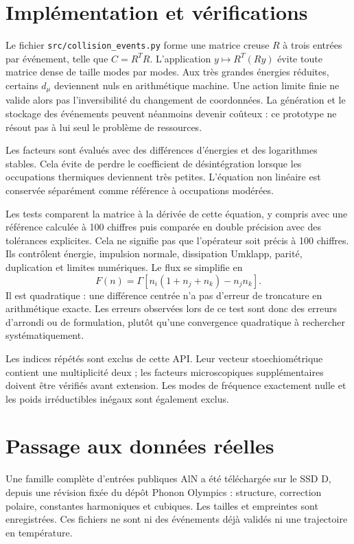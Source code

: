 \documentclass[11pt,a4paper]{article}
\begin{document}
\section{Implémentation et vérifications}
Le fichier \texttt{src/collision\_events.py} forme une matrice creuse $R$
à trois entrées par événement, telle que $C=R^TR$. L'application
$y\mapsto R^T(Ry)$ évite toute matrice dense de taille modes par modes.
Aux très grandes énergies réduites, certains $d_\mu$ deviennent nuls
en arithmétique machine. Une action limite finie ne valide alors pas
l'inversibilité du changement de coordonnées.
La génération et le stockage des événements peuvent néanmoins devenir
coûteux : ce prototype ne résout pas à lui seul le problème de ressources.

Les facteurs sont évalués avec des différences d'énergies et des logarithmes
stables. Cela évite de perdre le coefficient de désintégration lorsque les
occupations thermiques deviennent très petites.
L'équation non linéaire est conservée séparément comme référence à
occupations modérées.

Les tests comparent la matrice à la dérivée de cette équation, y compris
avec une référence calculée à 100 chiffres puis comparée en double
précision avec des tolérances explicites. Cela ne signifie pas que
l'opérateur soit précis à 100 chiffres. Ils contrôlent énergie, impulsion
normale, dissipation Umklapp, parité, duplication et limites numériques.
Le flux se simplifie en
\[
 F(n)=\Gamma[n_i(1+n_j+n_k)-n_jn_k].
\]
Il est quadratique : une différence centrée n'a pas d'erreur de troncature
en arithmétique exacte. Les erreurs observées lors de ce test sont donc
des erreurs d'arrondi ou de formulation, plutôt qu'une convergence
quadratique à rechercher systématiquement.

Les indices répétés sont exclus de cette API. Leur vecteur
stoechiométrique contient une multiplicité deux ; les facteurs
microscopiques supplémentaires doivent être vérifiés avant extension.
Les modes de fréquence exactement nulle et les poids irréductibles
inégaux sont également exclus.

\section{Passage aux données réelles}
Une famille complète d'entrées publiques AlN a été téléchargée sur le
SSD D, depuis une révision fixée du dépôt Phonon Olympics :
structure, correction polaire, constantes harmoniques et cubiques.
Les tailles et empreintes sont enregistrées. Ces fichiers ne sont
ni des événements déjà validés ni une trajectoire en température.
\end{document}
